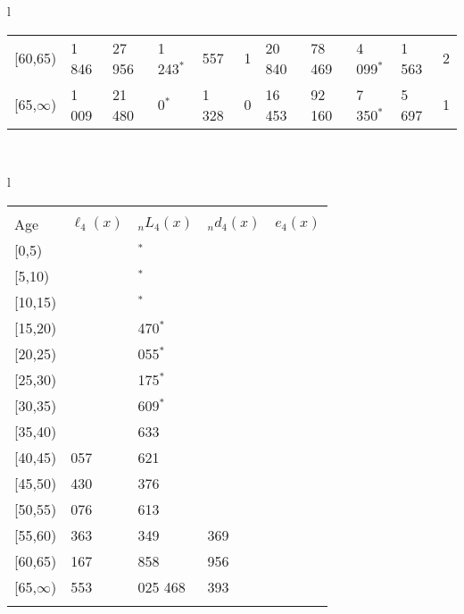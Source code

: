 \documentclass[
]{article}
\begin{document}
\begin{table}
\begin{tabular}[t]{l}
\begin{tabular}
{}[60,65) & 1 846 & 27 956 & 1 243$^{*}$ & 557 & 1 & 20 840 & 78 469 & 4 099$^{*}$ & 1 563 & 2\\
{}[65,$\infty$) & 1 009 & 21 480 & 0$^{*}$ & 1 328 & 0 & 16 453 & 92 160 & 7 350$^{*}$ & 5 697 & 1\\
\end{tabular}\\
\end{tabular}
\centering
\begin{tabular}[t]{l}
\hline
\begin{tabular}{>{\raggedright\arraybackslash}p{.43in}>{\raggedleft\arraybackslash}p{1.3in}>{\raggedleft\arraybackslash}p{1.3in}>{\raggedleft\arraybackslash}p{1.3in}>{\raggedleft\arraybackslash}p{1.3in}}
\toprule
\multicolumn{1}{c}{ } & \multicolumn{4}{c}{(4) Lost both} \\
\cmidrule(l{3pt}r{3pt}){2-5}
Age & $\ell_{4}(x)$ & ${}_nL_{4}(x)$ & ${}_nd_{4}(x)$ & $e_{4}(x)$\\
\midrule
{}[0,5) & 0 & 0$^{*}$ & 0 & 17\\
{}[5,10) & 0 & 968$^{*}$ & 0 & 17\\
{}[10,15) & 967 & 0$^{*}$ & 0 & 17\\
{}[15,20) & 967 & 3 470$^{*}$ & 4 & 17\\
{}[20,25) & 963 & 1 055$^{*}$ & 2 & 17\\
\addlinespace
{}[25,30) & 961 & 4 175$^{*}$ & 10 & 17\\
{}[30,35) & 951 & 16 609$^{*}$ & 47 & 18\\
{}[35,40) & 904 & 29 633 & 106 & 18\\
{}[40,45) & 5 057 & 30 621 & 143 & 18\\
{}[45,50) & 8 430 & 52 376 & 329 & 18\\
\addlinespace
{}[50,55) & 14 076 & 105 613 & 942 & 18\\
{}[55,60) & 32 363 & 177 349 & 2 369 & 17\\
{}[60,65) & 33 167 & 248 858 & 4 956 & 16\\
{}[65,$\infty$) & 33 553 & 1 025 468 & 63 393 & 14\\
\bottomrule
\multicolumn{5}{l}{\rule{0pt}{1em}\textsuperscript{*} Based on an estimated from SIPP with less than 10 respondents in the numerator.}\\
\end{tabular}\\
\end{tabular}
\end{table}
\end{document}

